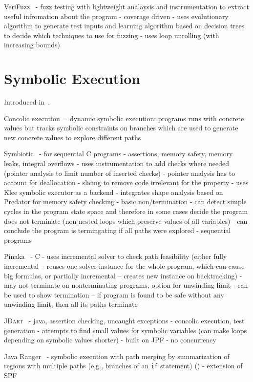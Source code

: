 VeriFuzz~\cite{Basak2019}
- fuzz testing with lightweight analaysis and instrumentation to extract useful infromation about the program
- coverage driven
- uses evolutionary algorithm to generate test inputs and learning algorithm based on decision trees to decide which techniques to use for fuzzing
- uses loop unrolling (with increasing bounds)

\section{Symbolic Execution}

Introduced in~\cite{King1976}.

Concolic execution = dynamic symbolic execution: programs runs with concrete values but tracks symbolic constraints on branches which are used to generate new concrete values to explore different paths


Symbiotic~\cite{Chalupa2018,Chalupa2020}
- for sequential C programs
- assertions, memory safety, memory leaks, integral overflows
- uses instrumentation to add checks where needed (pointer analysis to limit number of inserted checks)
  - pointer analysis has to account for deallocation
- slicing to remove code irrelevant for the property 
- uses Klee symbolic executor as a backend
- integrates shape analysis based on Predator\cite{TODO} for memory safety checking
- basic non/termination
    - can detect simple cycles in the program state space and therefore in some cases decide the program does not terminate (non-nested loops which preserve values of all variables)
    - can conclude the program is termingating if all paths were explored
- sequential programs

Pinaka~\cite{Chaudhary2019}
- C
- uses incremental solver to check path feasibility (either fully incremental -- reuses one solver instance for the whole program, which can cause big formulas, or partially incremental -- creates new instance on backtracking)
- may not terminate on nonterminating programs, option for unwinding limit
- can be used to show termination -- if program is found to be safe without any unwinding limit, then all its paths terminate

\textsc{JDart}~\cite{Mues2020,Luckow2016}
- java, assertion checking, uncaught exceptions
- concolic execution, test generation
- attempts to find small values for symbolic variables (can make loops depending on symbolic values shorter)
- built on JPF
- no concurrency

Java Ranger~\cite{Sharma2020}
- symbolic execution with path merging by summarization of regions with multiple paths (e.g., branches of an \texttt{if} statement) ()
- extension of SPF

